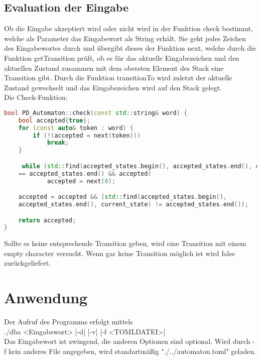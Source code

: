 \documentclass[12pt,a4paper]{article}
\begin{document}
\subsection{Evaluation der Eingabe}
Ob die Eingabe akzeptiert wird oder nicht wird in der Funktion check bestimmt, welche als Parameter das Eingabewort als String erhält. Sie geht jedes Zeichen des Eingabewortes durch und übergibt dieses der Funktion next, welche durch die Funktion getTransition prüft, ob es für das aktuelle Eingabezeichen und den aktuellen Zustand zusammen mit dem obersten Element des Stack eine Transition gibt. Durch die Funktion transitionTo wird zuletzt der aktuelle Zustand gewechselt und das Eingabezeichen wird auf den Stack gelegt.
\\
Die Check-Funktion:

\begin{lstlisting}[language=C++]
bool PD_Automaton::check(const std::string& word) {
    bool accepted{true};
    for (const auto& token : word) {
        if (!(accepted = next(token)))
            break;
    }

     while (std::find(accepted_states.begin(), accepted_states.end(), current_state) 
	== accepted_states.end() && accepted)
        	accepted = next(0);

    accepted = accepted && (std::find(accepted_states.begin(), 
    accepted_states.end(), current_state) != accepted_states.end());

    return accepted;
}
\end{lstlisting}
\medskip
Sollte es keine entsprechende Transition geben, wird eine Transition mit einem empty character versucht. Wenn gar keine Transition möglich ist wird false zurückgeliefert.


\section{Anwendung}
Der Aufruf des Programms erfolgt mittels
\\
\medskip
 ./dba <Eingabewort> [-d] [-v] [-f <TOMLDATEI>]
\\
\bigskip
Das Eingabewort ist zwingend, die anderen Optionen sind optional. Wird durch -f kein anderes File angegeben, wird standartmäßig "./../automaton.toml" geladen.
\end{document}

